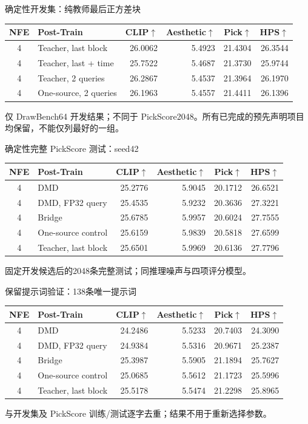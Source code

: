 \documentclass[10pt,aspectratio=169]{beamer}
\begin{document}
\begin{frame}{确定性开发集：纯教师最后正方差块}
\scriptsize\centering
\begin{tabular}{clrrrr}\toprule
NFE & Post-Train & CLIP$\uparrow$ & Aesthetic$\uparrow$ & Pick$\uparrow$ & HPS$\uparrow$\\\midrule
4 & Teacher, last block & 26.0062 & 5.4923 & 21.4304 & 26.3544 \\
4 & Teacher, last + time & 25.7522 & 5.4687 & 21.3730 & 25.9744 \\
4 & Teacher, 2 queries & 26.2867 & 5.4537 & 21.3964 & 26.1970 \\
4 & One-source, 2 queries & 26.1963 & 5.4557 & 21.4411 & 26.1396 \\
\bottomrule\end{tabular}\par\raggedright\vspace{6pt}
仅 DrawBench64 开发结果；不同于 PickScore2048。所有已完成的预先声明项目均保留，不能仅列最好的一组。
\end{frame}
\begin{frame}{确定性完整 PickScore 测试：seed42}
\scriptsize\centering
\begin{tabular}{clrrrr}\toprule
NFE & Post-Train & CLIP$\uparrow$ & Aesthetic$\uparrow$ & Pick$\uparrow$ & HPS$\uparrow$\\\midrule
4 & DMD & 25.2776 & 5.9045 & 20.1712 & 26.6521 \\
4 & DMD, FP32 query & 25.4535 & 5.9232 & 20.3636 & 27.3221 \\
4 & Bridge & 25.6785 & 5.9957 & 20.6024 & 27.7555 \\
4 & One-source control & 25.6159 & 5.9839 & 20.5818 & 27.6599 \\
4 & Teacher, last block & 25.6501 & 5.9969 & 20.6136 & 27.7796 \\
\bottomrule\end{tabular}\par\raggedright\vspace{6pt}
固定开发候选后的2048条完整测试；同推理噪声与四项评分模型。
\end{frame}
\begin{frame}{保留提示词验证：138条唯一提示词}
\scriptsize\centering
\begin{tabular}{clrrrr}\toprule
NFE & Post-Train & CLIP$\uparrow$ & Aesthetic$\uparrow$ & Pick$\uparrow$ & HPS$\uparrow$\\\midrule
4 & DMD & 24.2486 & 5.5233 & 20.7403 & 24.3090 \\
4 & DMD, FP32 query & 24.9384 & 5.5316 & 20.9671 & 25.2387 \\
4 & Bridge & 25.3987 & 5.5905 & 21.1894 & 25.7627 \\
4 & One-source control & 25.0685 & 5.5612 & 21.1723 & 25.5996 \\
4 & Teacher, last block & 25.5178 & 5.5474 & 21.2298 & 25.8965 \\
\bottomrule\end{tabular}\par\raggedright\vspace{6pt}
与开发集及 PickScore 训练/测试逐字去重；结果不用于重新选择参数。
\end{frame}
\end{document}
